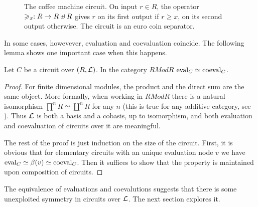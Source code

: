 \begin{figure}[!ht]
  \centering
  
  
  \caption{The coffee machine circuit. On input $r\in R$, the operator
    $\geqslant_x:R\rightarrow R\uplus R$ gives $r$ on its first output if $r\ge x$, on its
    second output otherwise. The circuit is an euro coin separator.}
  \label{fig:coffee}
\end{figure}

In some cases, howevever, evaluation and coevaluation coincide. The
following lemma shows one important case when this happens.

\begin{lemma}
  \label{th:coeval}
  Let $C$ be a circuit over $(R,\mathcal{L})$. In the category $RMod{R}$
  $\operatorname{eval}_C\simeq\operatorname{coeval}_C$.
\end{lemma}
\begin{proof}
  For finite dimensional modules, the product and the direct sum are
  the same object. More formally, when working in $RMod{R}$ there is
  a natural isomorphism $\prod^n R\simeq\coprod^n R$ for any $n$ (this
  is true for any additive category, see \cite[VIII.2]{McLane}). Thus
  $\mathcal{L}$ is both a basis and a cobasis, up to isomorphism, and both
  evaluation and coevaluation of circuits over it are meaningful.

  The rest of the proof is just induction on the size of the
  circuit. First, it is obvious that for elementary circuits with an
  unique evaluation node $v$ we have $\operatorname{eval}_C \simeq \beta(v) \simeq
  \operatorname{coeval}_C$. Then it suffices to show that the property is maintained
  upon composition of circuits.
\end{proof}

The equivalence of evaluations and coevalutions suggests that there is
some unexploited symmetry in circuits over $\mathcal{L}$. The next
section explores it.




%
